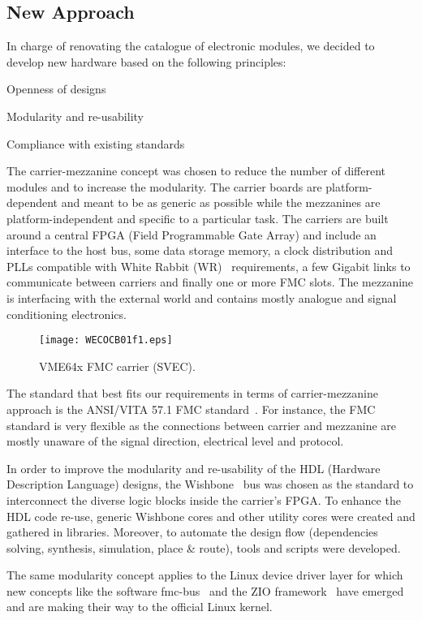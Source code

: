 \documentclass{JAC2003}
\begin{document}
\subsection{New Approach}
In charge of renovating the catalogue of electronic modules, we decided to develop new hardware based on the following principles:
\begin{Itemize}
\item Openness of designs
\item Modularity and re-usability
\item Compliance with existing standards
\end{Itemize}

The carrier-mezzanine concept was chosen to reduce the number of different modules and to increase the modularity.
The carrier boards are platform-dependent and meant to be as generic as possible while the mezzanines are platform-independent and specific to a particular task.
The carriers are built around a central FPGA (Field Programmable Gate Array) and include an interface to the host bus, some data storage memory, a clock distribution and PLLs compatible with White Rabbit (WR)~\cite{wr} requirements, a few Gigabit links to communicate between carriers and finally one or more FMC slots.
The mezzanine is interfacing with the external world and contains mostly analogue and signal conditioning electronics.

\begin{figure}[htb]
   \centering
   \texttt{[image: WECOCB01f1.eps]}
   \caption{VME64x FMC carrier (SVEC).}
   \label{svec}
\end{figure}

The standard that best fits our requirements in terms of carrier-mezzanine approach is the ANSI/VITA 57.1 FMC standard~\cite{fmc}.
For instance, the FMC standard is very flexible as the connections between carrier and mezzanine are mostly unaware of the signal direction, electrical level and protocol.

In order to improve the modularity and re-usability of the HDL (Hardware Description Language) designs, the Wishbone~\cite{wishbone} bus was chosen as the standard to interconnect the diverse logic blocks inside the carrier's FPGA.
To enhance the HDL code re-use, generic Wishbone cores and other utility cores were created and gathered in libraries.
Moreover, to automate the design flow (dependencies solving, synthesis, simulation, place \& route), tools and scripts were developed.

The same modularity concept applies to the Linux device driver layer for which new concepts like the software fmc-bus~\cite{fmc-bus} and the ZIO framework~\cite{zio} have emerged and are making their way to the official Linux kernel.
\end{document}
